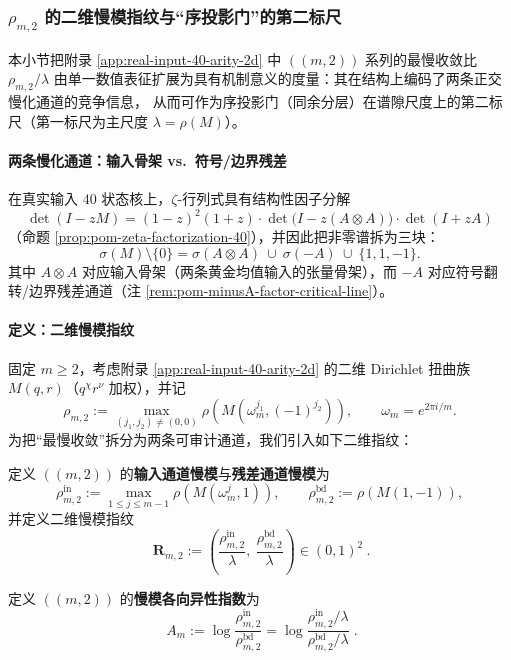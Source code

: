 \subsubsection{\texorpdfstring{$\rho_{m,2}$}{rho(m,2)} 的二维慢模指纹与“序投影门”的第二标尺}\label{subsec:rho-m2-2d-fingerprint}
本小节把附录 \ref{app:real-input-40-arity-2d} 中 \(((m,2))\) 系列的最慢收敛比
\(\rho_{m,2}/\lambda\) 由单一数值表征扩展为具有机制意义的度量：其在结构上编码了两条正交慢化通道的竞争信息，
从而可作为序投影门（同余分层）在谱隙尺度上的第二标尺（第一标尺为主尺度 \(\lambda=\rho(M)\)）。

\paragraph{两条慢化通道：输入骨架 vs.\ 符号/边界残差}
在真实输入 \(40\) 状态核上，\(\zeta\)-行列式具有结构性因子分解
\[
\det(I-zM)=(1-z)^2(1+z)\cdot \det\!\bigl(I-z(A\otimes A)\bigr)\cdot \det(I+zA)
\]
（命题 \ref{prop:pom-zeta-factorization-40}），并因此把非零谱拆为三块：
\[
\sigma(M)\setminus\{0\}=\sigma(A\otimes A)\ \cup\ \sigma(-A)\ \cup\ \{1,1,-1\}.
\]
其中 \(A\otimes A\) 对应输入骨架（两条黄金均值输入的张量骨架），而 \(-A\) 对应符号翻转/边界残差通道（注 \ref{rem:pom-minusA-factor-critical-line}）。

\paragraph{定义：二维慢模指纹}
固定 \(m\ge 2\)，考虑附录 \ref{app:real-input-40-arity-2d} 的二维 Dirichlet 扭曲族 \(M(q,r)\)（\(q^ \chi r^\nu\) 加权），并记
\[
\rho_{m,2}:=\max_{(j_1,j_2)\neq(0,0)}\rho\!\left(M(\omega_m^{j_1},(-1)^{j_2})\right),
\qquad \omega_m=e^{2\pi i/m}.
\]
为把“最慢收敛”拆分为两条可审计通道，我们引入如下二维指纹：
\begin{definition}[二维慢模指纹]\label{def:rho-m2-fingerprint}
定义 \(((m,2))\) 的\textbf{输入通道慢模}与\textbf{残差通道慢模}为
\[
\rho^{\mathrm{in}}_{m,2}:=\max_{1\le j\le m-1}\rho\!\left(M(\omega_m^{j},1)\right),
\qquad
\rho^{\mathrm{bd}}_{m,2}:=\rho\!\left(M(1,-1)\right),
\]
并定义二维慢模指纹
\[
\boxed{\ \mathbf{R}_{m,2}:=\left(\frac{\rho^{\mathrm{in}}_{m,2}}{\lambda},\ \frac{\rho^{\mathrm{bd}}_{m,2}}{\lambda}\right)\in(0,1)^2\ }.
\]
\end{definition}

\begin{definition}\label{def:rho-m2-anisotropy-index}
定义 \(((m,2))\) 的\textbf{慢模各向异性指数}为
\[
\boxed{\;
A_m
:=\log\frac{\rho^{\mathrm{in}}_{m,2}}{\rho^{\mathrm{bd}}_{m,2}}
=\log\frac{\rho^{\mathrm{in}}_{m,2}/\lambda}{\rho^{\mathrm{bd}}_{m,2}/\lambda}\; }.
\]
\end{definition}

